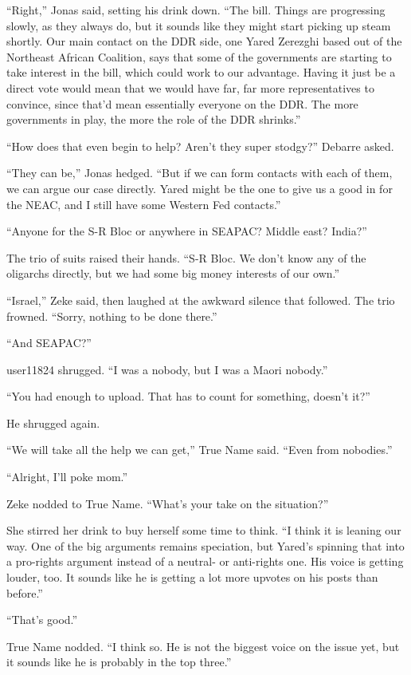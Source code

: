 ``Right,'' Jonas said, setting his drink down. ``The bill. Things are progressing slowly, as they always do, but it sounds like they might start picking up steam shortly. Our main contact on the DDR side, one Yared Zerezghi based out of the Northeast African Coalition, says that some of the governments are starting to take interest in the bill, which could work to our advantage. Having it just be a direct vote would mean that we would have far, far more representatives to convince, since that'd mean essentially everyone on the DDR. The more governments in play, the more the role of the DDR shrinks.''

``How does that even begin to help? Aren't they super stodgy?'' Debarre asked.

``They can be,'' Jonas hedged. ``But if we can form contacts with each of them, we can argue our case directly. Yared might be the one to give us a good in for the NEAC, and I still have some Western Fed contacts.''

``Anyone for the S-R Bloc or anywhere in SEAPAC? Middle east? India?''

The trio of suits raised their hands. ``S-R Bloc. We don't know any of the oligarchs directly, but we had some big money interests of our own.''

``Israel,'' Zeke said, then laughed at the awkward silence that followed. The trio frowned. ``Sorry, nothing to be done there.''

``And SEAPAC?''

user11824 shrugged. ``I was a nobody, but I was a Maori nobody.''

``You had enough to upload. That has to count for something, doesn't it?''

He shrugged again.

``We will take all the help we can get,'' True Name said. ``Even from nobodies.''

``Alright, I'll poke mom.''

Zeke nodded to True Name. ``What's your take on the situation?''

She stirred her drink to buy herself some time to think. ``I think it is leaning our way. One of the big arguments remains speciation, but Yared's spinning that into a pro-rights argument instead of a neutral- or anti-rights one. His voice is getting louder, too. It sounds like he is getting a lot more upvotes on his posts than before.''

``That's good.''

True Name nodded. ``I think so. He is not the biggest voice on the issue yet, but it sounds like he is probably in the top three.''

